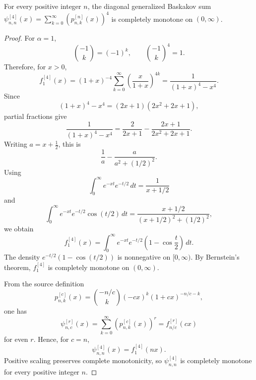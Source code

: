 \begin{lemma}[Baskakov diagonal r=4 c=n generalized sum is completely monotone]
\label{res:baskakov-diagonal-r4-c-equals-n-cm}
For every positive integer \(n\), the diagonal generalized Baskakov sum \(\psi^{[4]}_{n,n}(x)=\sum_{k=0}^{\infty}(p^{[n]}_{n,k}(x))^4\) is completely monotone on \((0,\infty)\).
\end{lemma}
\begin{proof}
For \(\alpha=1\),
\[
\binom{-1}{k}=(-1)^k,
\qquad
\binom{-1}{k}^{4}=1.
\]
Therefore, for \(x>0\),
\[
f^{[4]}_1(x)
=(1+x)^{-4}\sum_{k=0}^{\infty}
\left(\frac{x}{1+x}\right)^{4k}
=\frac{1}{(1+x)^4-x^4}.
\]
Since
\[
(1+x)^4-x^4=(2x+1)(2x^2+2x+1),
\]
partial fractions give
\[
\frac{1}{(1+x)^4-x^4}
=\frac{2}{2x+1}-\frac{2x+1}{2x^2+2x+1}.
\]
Writing \(a=x+\frac12\), this is
\[
\frac{1}{a}-\frac{a}{a^2+(1/2)^2}.
\]
Using
\[
\int_0^\infty e^{-xt}e^{-t/2}\,dt=\frac{1}{x+1/2}
\]
and
\[
\int_0^\infty e^{-xt}e^{-t/2}\cos(t/2)\,dt
=\frac{x+1/2}{(x+1/2)^2+(1/2)^2},
\]
we obtain
\[
f^{[4]}_1(x)
=\int_0^\infty e^{-xt}e^{-t/2}\left(1-\cos\frac{t}{2}\right)\,dt.
\]
The density \(e^{-t/2}(1-\cos(t/2))\) is nonnegative on \([0,\infty)\). By Bernstein's theorem, \(f^{[4]}_1\) is completely monotone on \((0,\infty)\).

From the source definition
\[
p^{[c]}_{n,k}(x)=\binom{-n/c}{k}(-cx)^k(1+cx)^{-n/c-k},
\]
one has
\[
\psi^{[r]}_{n,c}(x)=\sum_{k=0}^{\infty}\left(p^{[c]}_{n,k}(x)\right)^r
=f^{[r]}_{n/c}(cx)
\]
for even \(r\). Hence, for \(c=n\),
\[
\psi^{[4]}_{n,n}(x)=f^{[4]}_1(nx).
\]
Positive scaling preserves complete monotonicity, so \(\psi^{[4]}_{n,n}\) is completely monotone for every positive integer \(n\).
\end{proof}

